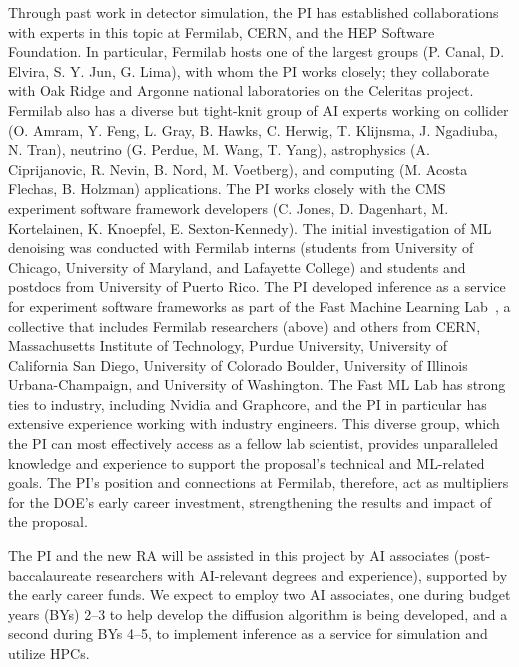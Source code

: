 Through past work in detector simulation, the PI has established collaborations with experts in this topic at Fermilab, CERN, and the HEP Software Foundation.
In particular, Fermilab hosts one of the largest \GEANTfour groups (P. Canal, D. Elvira, S. Y. Jun, G. Lima), with whom the PI works closely;
they collaborate with Oak Ridge and Argonne national laboratories on the Celeritas project.
Fermilab also has a diverse but tight-knit group of AI experts working on collider (O. Amram, Y. Feng, L. Gray, B. Hawks, C. Herwig, T. Klijnsma, J. Ngadiuba, N. Tran),
neutrino (G. Perdue, M. Wang, T. Yang), astrophysics (A. Ciprijanovic, R. Nevin, B. Nord, M. Voetberg), and computing (M. Acosta Flechas, B. Holzman) applications.
The PI works closely with the CMS experiment software framework developers (C. Jones, D. Dagenhart, M. Kortelainen, K. Knoepfel, E. Sexton-Kennedy).
The initial investigation of ML denoising was conducted with Fermilab interns (students from University of Chicago, University of Maryland, and Lafayette College) and students and postdocs from University of Puerto Rico.
The PI developed inference as a service for experiment software frameworks as part of the Fast Machine Learning Lab~\cite{FML},
a collective that includes Fermilab researchers (above)
and others from CERN, Massachusetts Institute of Technology, Purdue University, University of California San Diego, University of Colorado Boulder, University of Illinois Urbana-Champaign, and University of Washington.
The Fast ML Lab has strong ties to industry, including Nvidia and Graphcore, and the PI in particular has extensive experience working with industry engineers.
This diverse group, which the PI can most effectively access as a fellow lab scientist,
provides unparalleled knowledge and experience to support the proposal's technical and ML-related goals.
The PI's position and connections at Fermilab, therefore, act as multipliers for the DOE's early career investment, strengthening the results and impact of the proposal.

The PI and the new RA will be assisted in this project by AI associates (post-baccalaureate researchers with AI-relevant degrees and experience), supported by the early career funds.
We expect to employ two AI associates, one during budget years (BYs) 2--3 to help develop the diffusion algorithm is being developed, and a second during BYs 4--5, to implement inference as a service for simulation and utilize HPCs.